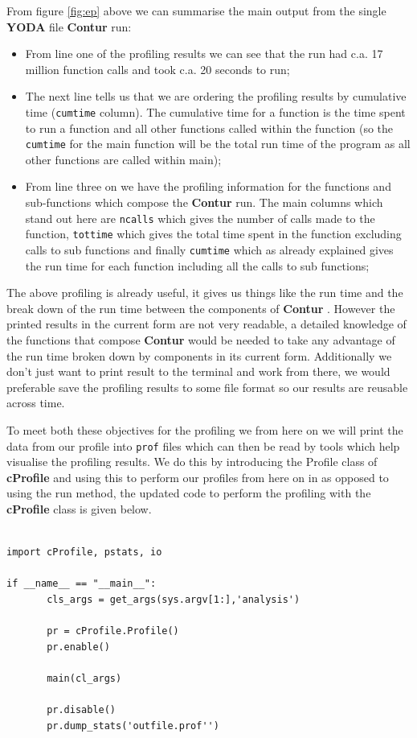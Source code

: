From figure \ref{fig:ep} above we can summarise the main output from the single \textbf{YODA} file \textbf{Contur} run:

\begin{itemize}
\item From line one of the profiling results we can see that the run had c.a. 17 million function calls and took c.a. 20 seconds to run;
\item The next line tells us that we are ordering the profiling results by cumulative time (\texttt{cumtime} column). The cumulative time for a function is the time spent to run a function and all other functions called within the function (so the \texttt{cumtime} for the main function will be the total run time of the program as all other functions are called within main);
\item From line three on we have the profiling information for the functions and sub-functions which compose the \textbf{Contur}  run. The main columns which stand out here are \texttt{ncalls} which gives the number of calls made to the function, \texttt{tottime} which gives the total time spent in the function excluding calls to sub functions and finally \texttt{cumtime} which as already explained gives the run time for each function including all the calls to sub functions;
\end{itemize}

The above profiling is already useful, it gives us things like the run time and the break down of the run time between the components of \textbf{Contur} . However the printed results in the current form are not very readable, a detailed knowledge of the functions that compose \textbf{Contur} would be needed to take any advantage of the run time broken down by components in its current form. Additionally we don't just want to print result to the terminal and work from there, we would preferable save the profiling results to some file format so our results are reusable across time. 

To meet both these objectives for the profiling we  from here on we will print the data from our profile into \texttt{prof} files which can then be read by tools which help visualise the profiling results. We do this by introducing the Profile class of \textbf{cProfile} and using this to perform our profiles from here on in as opposed to using the run method, the updated code to perform the profiling with the \textbf{cProfile} class is given below.

\begin{verbatim}

import cProfile, pstats, io

if __name__ == "__main__":
       cls_args = get_args(sys.argv[1:],'analysis')
       
       pr = cProfile.Profile()
       pr.enable()
       
       main(cl_args)
       
       pr.disable()
       pr.dump_stats('outfile.prof'')
\end{verbatim}


